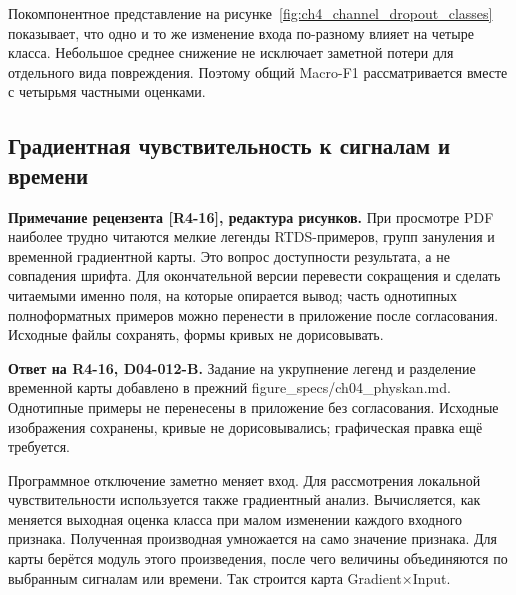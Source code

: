 Покомпонентное представление на
рисунке~\ref{fig:ch4_channel_dropout_classes}
показывает, что одно и то же изменение входа
по-разному влияет на четыре класса.
Небольшое среднее снижение не исключает
заметной потери для отдельного вида повреждения.
Поэтому общий Macro-F1 рассматривается вместе
с четырьмя частными оценками.

\clearpage
\subsection{Градиентная чувствительность к сигналам и времени}
\label{sec:ch4_gradient_sensitivity}

\ifdefined\AuthorReview
\par\smallskip\begingroup\small\raggedright\color{red!60!black}
\noindent\textbf{Примечание рецензента [R4-16], редактура рисунков.} При просмотре PDF наиболее трудно читаются мелкие легенды RTDS-примеров, групп зануления и временной градиентной карты. Это вопрос доступности результата, а не совпадения шрифта. Для окончательной версии перевести сокращения и сделать читаемыми именно поля, на которые опирается вывод; часть однотипных полноформатных примеров можно перенести в приложение после согласования. Исходные файлы сохранять, формы кривых не дорисовывать.\par\endgroup\smallskip
\fi
\ifdefined\AuthorReview
\par\smallskip\begingroup\small\raggedright\color{blue!55!black}
\noindent\textbf{Ответ на R4-16, D04-012-B.} Задание на укрупнение легенд и разделение временной карты добавлено в прежний figure\_specs/ch04\_physkan.md. Однотипные примеры не перенесены в приложение без согласования. Исходные изображения сохранены, кривые не дорисовывались; графическая правка ещё требуется.\par\endgroup\smallskip
\fi

{}

Программное отключение заметно меняет вход.
Для рассмотрения локальной чувствительности используется
также градиентный анализ. Вычисляется, как меняется
выходная оценка класса при малом изменении каждого
входного признака. Полученная производная умножается
на само значение признака. Для карты берётся модуль
этого произведения, после чего величины
объединяются по выбранным сигналам или времени.
Так строится карта Gradient×Input.

